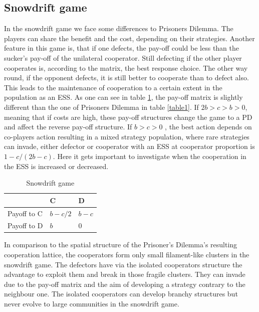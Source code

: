\documentclass[DIV=calc, paper=a4, fontsize=11pt, twocolumn]{scrartcl}	 %
\begin{document}
\subsection*{Snowdrift game}

In the snowdrift game we face some differences to Prisoners Dilemma. The players can share the benefit and the cost, depending on their strategies. Another feature in this game is, that if one defects, the pay-off could be less than the sucker's pay-off of the unilateral cooperator. Still defecting if the other player cooperates is, according to the matrix, the best response choice. The other way round, if the opponent defects, it is still better to cooperate than to defect also. This leads to the maintenance of cooperation to a certain extent in the population as an ESS. As one can see in table \ref{table2}, the pay-off matrix is slightly different than the one of Prisoners Dilemma in table \ref{table1}. 
If $2b > c > b > 0$, meaning that if costs are high, these pay-off structures change the game to a PD and affect the reverse pay-off structure. If $b > c > 0$ , the best action depends on co-players action resulting in a mixed strategy population, where rare strategies can invade, either defector or cooperator with an ESS at cooperator proportion is $1- c/(2b-c)$. Here it gets important to investigate when the cooperation in the ESS is increased or decreased.


\begin{table}[h]
\caption{Snowdrift game}
\label{table2}
\centering
\begin{tabular}{lll}
 & C & D \\
\midrule
Payoff to C & $b-c/2$ & $b-c$ \\
Payoff to D & $b$ & $0$ \\
\bottomrule
\end{tabular}
\end{table}

In comparison to the spatial structure  of the Prisoner's Dilemma's resulting cooperation lattice, the cooperators form only small filament-like clusters in the snowdrift game. The defectors have via the isolated cooperators structure the advantage to exploit them and break in those fragile clusters. They can invade due to the pay-off matrix and the aim of developing a strategy contrary to the neighbour one. The isolated cooperators can develop branchy structures but never evolve to large communities in the snowdrift game. 
\end{document}

